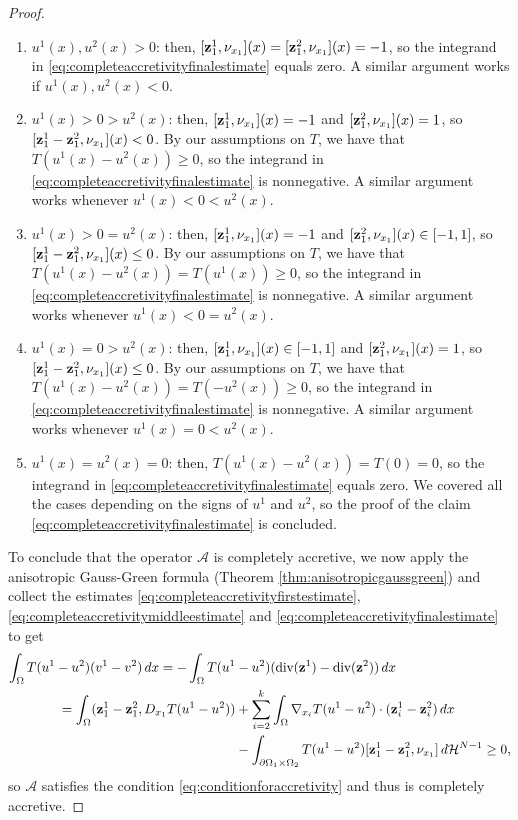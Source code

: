 \documentclass[reqno,12pt]{amsart}
\def\z{{\bf z}}
\numberwithin{equation}{section}
\begin{document}
\begin{proof}
\begin{enumerate}
\item $u^1(x), u^2(x) > 0$: then, $[\z_1^1, \nu_{x_1}](x) = [\z_1^2, \nu_{x_1}](x) = -1$, so the integrand in \eqref{eq:completeaccretivityfinalestimate} equals zero. A similar argument works if $u^1(x), u^2(x) < 0$.

\item $u^1(x) > 0 > u^2(x)$: then, $[\z_1^1, \nu_{x_1}](x) = -1$ and $[\z_1^2, \nu_{x_1}](x) = 1$, so $[\z_1^1 - \z_1^2, \nu_{x_1}](x) < 0$. By our assumptions on $T$, we have that $T(u^1(x) - u^2(x)) \geq 0$, so the integrand in \eqref{eq:completeaccretivityfinalestimate} is nonnegative. A similar argument works whenever $u^1(x) < 0 < u^2(x)$.

\item $u^1(x) > 0 = u^2(x)$: then, $[\z_1^1, \nu_{x_1}](x) = -1$ and $[\z_1^2, \nu_{x_1}](x) \in [-1, 1]$, so $[\z_1^1 - \z_1^2, \nu_{x_1}](x) \leq 0$. By our assumptions on $T$, we have that $T(u^1(x) - u^2(x)) = T(u^1(x)) \geq 0$, so the integrand in \eqref{eq:completeaccretivityfinalestimate} is nonnegative. A similar argument works whenever $u^1(x) < 0 = u^2(x)$.

\item $u^1(x) = 0 > u^2(x)$: then, $[\z_1^1, \nu_{x_1}](x) \in [-1,1]$ and $[\z_1^2, \nu_{x_1}](x) = 1$, so $[\z_1^1 - \z_1^2, \nu_{x_1}](x) \leq 0$. By our assumptions on $T$, we have that $T(u^1(x) - u^2(x)) = T(-u^2(x)) \geq 0$, so the integrand in \eqref{eq:completeaccretivityfinalestimate} is nonnegative. A similar argument works whenever $u^1(x) = 0 < u^2(x)$.

\item $u^1(x) = u^2(x) = 0$: then, $T(u^1(x) - u^2(x)) = T(0) = 0$, so the integrand in \eqref{eq:completeaccretivityfinalestimate} equals zero. We covered all the cases depending on the signs of $u^1$ and $u^2$, so the proof of the claim \eqref{eq:completeaccretivityfinalestimate} is concluded.
\end{enumerate}

To conclude that the operator $\mathcal{A}$ is completely accretive, we now apply the anisotropic Gauss-Green formula (Theorem \ref{thm:anisotropicgaussgreen}) and collect the estimates \eqref{eq:completeaccretivityfirstestimate}, \eqref{eq:completeaccretivitymiddleestimate} and \eqref{eq:completeaccretivityfinalestimate} to get
\begin{align}
\int_{\Omega}T(u^1-u^2) (v^1-v^2)\, dx = - \int_{\Omega} T(u^1 &- u^2) (\mbox{div}(\z^1)- \mbox{div}(\z^2)) \, dx \\
= \int_{\Omega} (\z^1_1 - \z^2_1, D_{x_1} T(u^1 - u^2)) &+ \sum_{i=2}^k \int_{\Omega} \nabla_{x_i} T(u^1-u^2) \cdot (\z^1_i - \z^2_i) \, dx \\
&- \int_{\partial\Omega_1 \times \Omega_2} T(u^1 - u^2) [\z_1^1 - \z_1^2, \nu_{x_1}] \, d\mathcal{H}^{N-1} \geq 0,
\end{align}
so $\mathcal{A}$ satisfies the condition \eqref{eq:conditionforaccretivity} and thus is completely accretive.
\end{proof}
\end{document}
